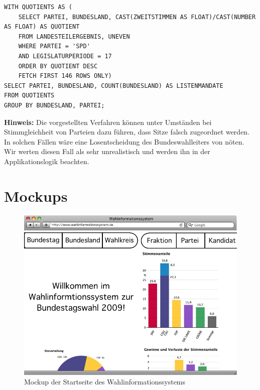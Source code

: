 \documentclass[a4paper]{article}
\begin{document}
\begin{lstlisting}[caption=Bestimmung der Landesmandate für die 17. Legislaturperiode und die Partei SPD]
WITH QUOTIENTS AS (
	SELECT PARTEI, BUNDESLAND, CAST(ZWEITSTIMMEN AS FLOAT)/CAST(NUMBER AS FLOAT) AS QUOTIENT
	FROM LANDESTEILERGEBNIS, UNEVEN
	WHERE PARTEI = 'SPD'
	AND LEGISLATURPERIODE = 17
	ORDER BY QUOTIENT DESC
	FETCH FIRST 146 ROWS ONLY)
SELECT PARTEI, BUNDESLAND, COUNT(BUNDESLAND) AS LISTENMANDATE
FROM QUOTIENTS
GROUP BY BUNDESLAND, PARTEI;
\end{lstlisting}

\textbf{Hinweis:} Die vorgestellten Verfahren können unter Umständen bei Stimmgleichheit von Parteien dazu führen, dass Sitze falsch zugeordnet werden. In solchen Fällen wäre eine Losentscheidung des Bundeswahlleiters von nöten.  Wir werten diesen Fall als sehr unrealistisch und werden ihn in der Applikationslogik beachten.

\addappheadtotoc
\appendix
\newpage

\section{Mockups}
\label{mockups}

\begin{figure}[h!]
\centering
\includegraphics[scale=0.4]{Mockups/startseite}
\caption{Mockup der Startseite des Wahlinformationssystems}
\end{figure}
\end{document}
